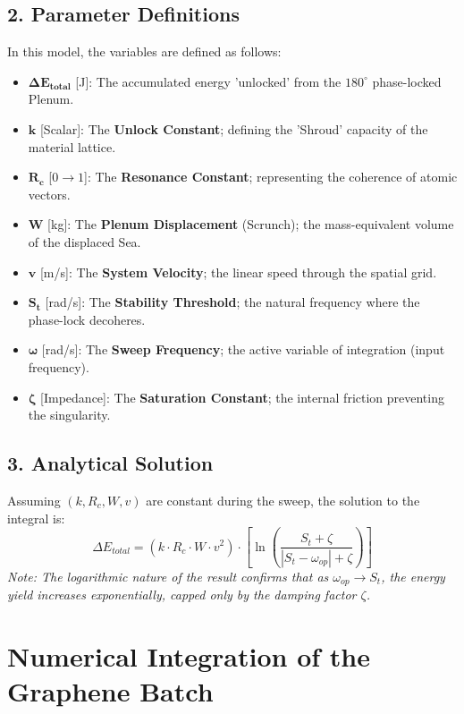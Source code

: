 \documentclass[11pt]{article}
\begin{document}
\subsection*{2. Parameter Definitions}
In this model, the variables are defined as follows:
\begin{itemize}
    \item $\mathbf{\Delta E_{total}}$ [J]: The accumulated energy 'unlocked' from the $180^\circ$ phase-locked Plenum.
    \item $\mathbf{k}$ [Scalar]: The \textbf{Unlock Constant}; defining the 'Shroud' capacity of the material lattice.
    \item $\mathbf{R_c}$ [$0 \to 1$]: The \textbf{Resonance Constant}; representing the coherence of atomic vectors.
    \item $\mathbf{W}$ [kg]: The \textbf{Plenum Displacement} (Scrunch); the mass-equivalent volume of the displaced Sea.
    \item $\mathbf{v}$ [m/s]: The \textbf{System Velocity}; the linear speed through the spatial grid.
    \item $\mathbf{S_t}$ [rad/s]: The \textbf{Stability Threshold}; the natural frequency where the phase-lock decoheres.
    \item $\mathbf{\omega}$ [rad/s]: The \textbf{Sweep Frequency}; the active variable of integration (input frequency).
    \item $\mathbf{\zeta}$ [Impedance]: The \textbf{Saturation Constant}; the internal friction preventing the singularity.
\end{itemize}

\subsection*{3. Analytical Solution}
Assuming $(k, R_c, W, v)$ are constant during the sweep, the solution to the integral is:
\begin{equation}
    \Delta E_{total} = (k \cdot R_c \cdot W \cdot v^2) \cdot \left[ \ln\left( \frac{S_t + \zeta}{|S_t - \omega_{op}| + \zeta} \right) \right]
\end{equation}
\textit{Note: The logarithmic nature of the result confirms that as $\omega_{op} \to S_t$, the energy yield increases exponentially, capped only by the damping factor $\zeta$.}

\section*{Numerical Integration of the Graphene Batch}
\end{document}
